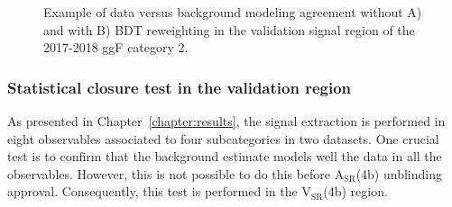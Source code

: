 \begin{figure}[ht!]
\begin{center}
\captionsetup[subfigure]{justification=centering}
\end{center}
\caption[Example of the data versus background modeling agreement in 20172018 ggF category 2 validation control region]{Example of data versus background modeling agreement without A) and with B) BDT reweighting in the validation signal region of the 2017-2018 ggF category 2.}
\label{fig:bdtreweightingexamplevalidationsr}
\end{figure}

\clearpage

\subsubsection{Statistical closure test in the validation region}
As presented in Chapter~\ref{chapter:results}, the signal extraction is performed in eight observables associated to four subcategories in two datasets. One crucial test is to confirm that the background estimate models well the data in all the observables. However, this is not possible to do this before $\mathrm{A_{SR}}$(4b)  unblinding approval. Consequently, this test is performed in the $\mathrm{V_{SR}}$(4b) region. 


